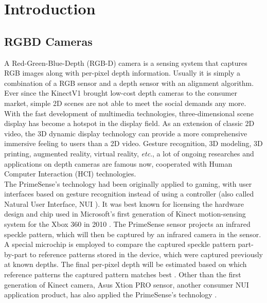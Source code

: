 \chapter{Introduction} %
\label{chapterIntroduction} 
\section{RGBD Cameras}
\indent
A Red-Green-Blue-Depth (RGB-D) camera is a sensing system that captures RGB images along with per-pixel depth information. Usually it is simply a combination of a RGB sensor and a depth sensor with an alignment algorithm. Ever since the KinectV1 brought low-cost depth cameras to the consumer market, simple 2D scenes are not able to meet the social demands any more. With the fast development of multimedia technologies, three-dimensional scene display has become a hotspot in the display field. As an extension of classic 2D video, the 3D dynamic display technology can provide a more comprehensive immersive feeling to users than a 2D video. Gesture recognition, 3D modeling, 3D printing, augmented reality, virtual reality, \textit{etc}., a lot of ongoing researches and applications on depth cameras are famous now, cooperated with Human Computer Interaction (HCI) technologies. %
\\\indent%
The PrimeSense's technology had been originally applied to gaming, with user interfaces based on gesture recognition instead of using a controller (also called Natural User Interface, NUI \cite{BraveNUIworld_2011}). It was best known for licensing the hardware design and chip used in Microsoft's first generation of Kinect motion-sensing system for the Xbox 360 in 2010 \cite{PrimeSenseInfo_2013}. The PrimeSense sensor projects an infrared speckle pattern, which will then be captured by an infrared camera in the sensor. A special microchip is employed to compare the captured speckle pattern part-by-part to reference patterns stored in the device, which were captured previously at known depths. The final per-pixel depth will be estimated based on which reference patterns the captured pattern matches best \cite{Krystof12}. Other than the first generation of Kinect camera, Asus Xtion PRO sensor, another consumer NUI application product, has also applied the PrimeSense's technology \cite{AsusXtion_2013}.
